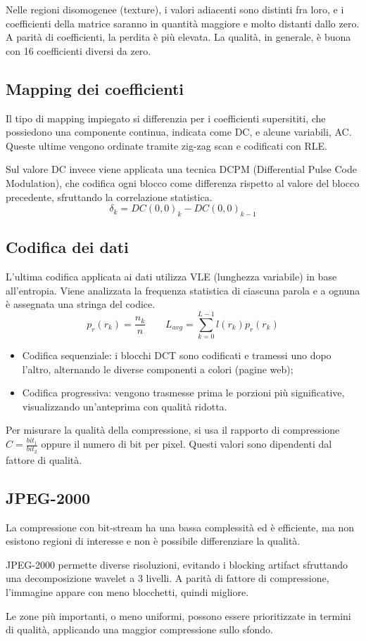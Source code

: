 Nelle regioni disomogenee (texture), i valori adiacenti sono distinti fra loro, e i coefficienti della matrice saranno in quantità maggiore e molto distanti dallo zero. A parità di coefficienti, la perdita è più elevata. La qualità, in generale, è buona con 16 coefficienti diversi da zero.

\subsection{Mapping dei coefficienti}
Il tipo di mapping impiegato si differenzia per i coefficienti supersititi, che possiedono una componente continua, indicata come DC, e alcune variabili, AC. Queste ultime vengono ordinate tramite zig-zag scan e codificati con RLE.

Sul valore DC invece viene applicata una tecnica DCPM (Differential Pulse Code Modulation), che codifica ogni blocco come differenza rispetto al valore del blocco precedente, sfruttando la correlazione statistica.
$$\delta_k = DC(0, 0)_k - DC(0, 0)_{k-1}$$

\subsection{Codifica dei dati}
L'ultima codifica applicata ai dati utilizza VLE (lunghezza variabile) in base all'entropia. Viene analizzata la frequenza statistica di ciascuna parola e a ognuna è assegnata una stringa del codice. 
$$p_r(r_k) = \frac{n_k}{n} \qquad L_{avg} = \sum_{k=0}^{L-1} l(r_k)p_r(r_k)$$

\begin{itemize}
	\item Codifica sequenziale: i blocchi DCT sono codificati e tramessi uno dopo l'altro, alternando le diverse componenti a colori (pagine web);
	\item Codifica progressiva: vengono trasmesse prima le porzioni più significative, visualizzando un'anteprima con qualità ridotta.
\end{itemize}

Per misurare la qualità della compressione, si usa il rapporto di compressione $C = \frac{bit_1}{bit_2}$ oppure il numero di bit per pixel. Questi valori sono dipendenti dal fattore di qualità. 

\subsection{JPEG-2000}
La compressione con bit-stream ha una bassa complessità ed è efficiente, ma non esistono regioni di interesse e non è possibile differenziare la qualità.

JPEG-2000 permette diverse risoluzioni, evitando i blocking artifact sfruttando una decomposizione wavelet a 3 livelli. A parità di fattore di compressione, l'immagine appare con meno blocchetti, quindi migliore.

Le zone più importanti, o meno uniformi, possono essere prioritizzate in termini di qualità, applicando una maggior compressione sullo sfondo.



